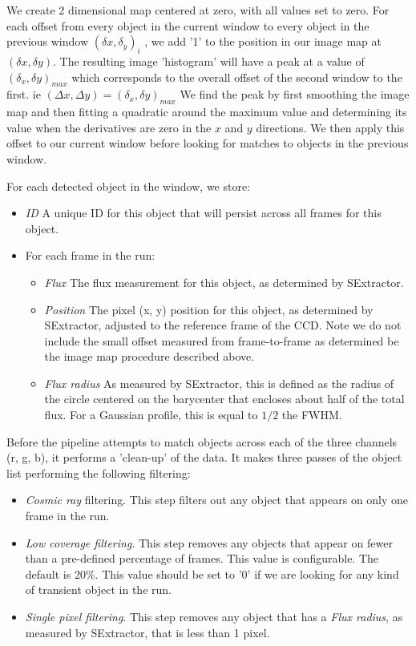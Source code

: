 We create 2 dimensional map centered at zero, with all values set to zero. For each offset from every object in the current window to every object in the previous window $(\delta x, \delta_y)_i$ , we add '1' to the position in our image map at $(\delta x, \delta y)$. The resulting image 'histogram' will have a peak at a value of $(\delta_x, \delta y)_{max}$ which corresponds to the overall offset of the second window to the first. ie $(\Delta x, \Delta y) = (\delta_x, \delta y)_{max}$ We find the peak by first smoothing the image map and then fitting a quadratic around the maximum value and determining its value when the derivatives are zero in the $x$ and $y$ directions. We then apply this offset to our current window before looking for matches to objects in the previous window.

For each detected object in the window, we store: 
\begin{itemize}
  \item \emph{ID} A unique ID for this object that will persist across all frames for this object.
  \item For each frame in the run:
  \begin{itemize}
    \item \emph{Flux} The flux measurement for this object, as determined by SExtractor.
    \item \emph{Position} The pixel (x, y) position for this object, as determined by SExtractor, adjusted to the reference frame of the CCD. Note we do not include the small offset measured from frame-to-frame as determined be the image map procedure described above. 
    \item \emph{Flux radius} As measured by SExtractor, this is defined as the radius of the circle centered on the barycenter that encloses about half of the total flux. For a Gaussian profile, this is equal to $1/2$ the FWHM. 
  \end{itemize}
\end{itemize}

Before the pipeline attempts to match objects across each of the three channels (r, g, b), it performs a 'clean-up' of the data. It makes three passes of the object list performing the following filtering:

\begin{itemize}
  \item \emph{Cosmic ray} filtering. This step filters out any object that appears on only one frame in the run. 
  \item \emph{Low coverage filtering}. This step removes any objects that appear on fewer than a pre-defined percentage of frames. This value is configurable. The default is 20\%. This value should be set to '0' if we are looking for any kind of transient object in the run. 
  \item \emph{Single pixel filtering}. This step removes any object that has a \emph{Flux radius}, as measured by SExtractor, that is less than 1 pixel.
\end{itemize}

